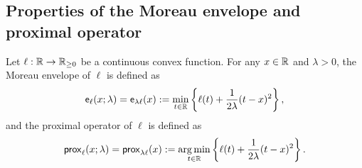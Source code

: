 \subsection{Properties of the Moreau envelope and proximal operator}
\label{append_subsec_Moreau}

Let $\ell: \mathbb{R} \to \mathbb{R}_{\ge 0}$ be a continuous convex function. For any $x \in \mathbb{R}$ and $\lambda > 0$, the Moreau envelope of $\ell$ is defined as
\begin{equation}\label{eq:envelope}
    \mathsf{e}_\ell(x; \lambda) = \mathsf{e}_{\lambda\ell}(x)
    := \min_{t \in \mathbb{R}} \left\{  \ell(t) +  \frac1{2\lambda} (t - x)^2 \right\},
\end{equation}
and the proximal operator of $\ell$ is defined as
\begin{equation*}
    \mathsf{prox}_{\ell}(x; \lambda) =
    \mathsf{prox}_{\lambda \ell}(x) := \operatorname*{arg\,min}_{t \in \mathbb{R}} \left\{ \ell(t) +  \frac1{2\lambda} (t - x)^2 \right\}.
\end{equation*}
